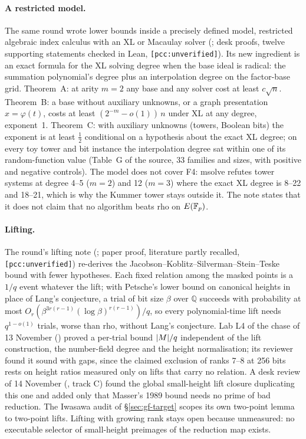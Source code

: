 \paragraph{A restricted model.} The same round wrote lower bounds inside a
precisely defined model, restricted algebraic index calculus with an XL or
Macaulay solver
(;
desk proofs, twelve supporting statements checked in Lean,
\texttt{[pcc:unverified]}). Its new ingredient is an exact formula for the
XL solving degree when the base ideal is radical: the summation polynomial's
degree plus an interpolation degree on the factor-base grid. Theorem~A: at
arity $m=2$ any base and any solver cost at least $c\sqrt n$. Theorem~B: a
base without auxiliary unknowns, or a graph presentation $x=\varphi(t)$,
costs at least $(2^{-m}-o(1))\,n$ under XL at any degree, exponent~1.
Theorem~C: with auxiliary unknowns (towers, Boolean bits) the exponent is at
least $\tfrac12$ conditional on a hypothesis about the exact XL degree; on
every toy tower and bit instance the interpolation degree sat within one of
its random-function value (Table~G of the source, 33 families and sizes,
with positive and negative controls). The model does not cover F4: msolve
refutes tower systems at degree 4--5 ($m=2$) and 12 ($m=3$) where the exact
XL degree is 8--22 and 18--21, which is why the Kummer tower stays outside
it. The note states that it does not claim that no algorithm beats rho on
$E(\mathbb{F}_p)$.

\paragraph{Lifting.} The round's lifting note
(;
paper proof, literature partly recalled, \texttt{[pcc:unverified]})
re-derives the Jacobson--Koblitz--Silverman--Stein--Teske bound with fewer
hypotheses. Each fixed relation among the masked points is a $1/q$ event
whatever the lift; with Petsche's lower bound on canonical heights in place
of Lang's conjecture, a trial of bit size $\beta$ over $\mathbb{Q}$ succeeds with
probability at most $O_r(\beta^{3r(r-1)}(\log\beta)^{r(r-1)})/q$, so every
polynomial-time lift needs $q^{1-o(1)}$ trials, worse than rho, without
Lang's conjecture. Lab L4 of the chase of 13 November
() proved a per-trial
bound $\lvert M \rvert/q$ independent of the lift construction, the number-field
degree and the height normalisation; its reviewer found it sound with gaps,
since the claimed exclusion of ranks 7--8 at 256 bits rests on height ratios
measured only on lifts that carry no relation. A desk review of 14 November
(, track C) found the global
small-height lift closure duplicating this one and added only that Masser's
1989 bound needs no prime of bad reduction. The Iwasawa audit of
\S\ref{sec:gf-target} scopes its own two-point lemma to two-point lifts.
Lifting with growing rank stays open because unmeasured: no executable
selector of small-height preimages of the reduction map exists.

